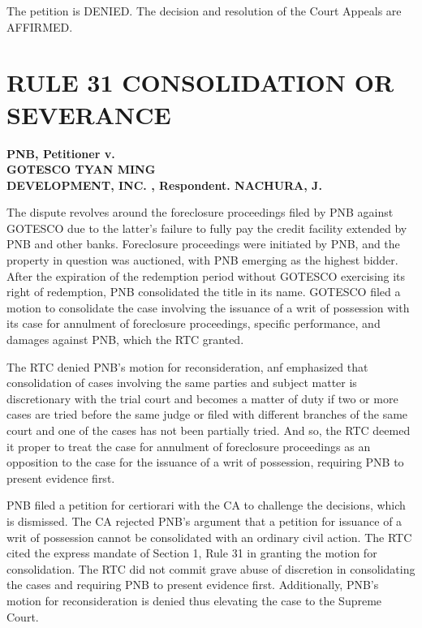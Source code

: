 \documentclass[
12pt,
oneside,
onehalfspacing,
headsepline
]{DigestCollection}
\begin{document}
The petition is DENIED. The decision and resolution of the Court Appeals are AFFIRMED.

\chapter{RULE 31 CONSOLIDATION OR SEVERANCE}
\label{80ccabf0-0a16-11ef-932c-63c852f65e48}


\label{1cbd0350-0a2d-11ef-a1a5-03b0bde1fccf}


\noindent\textbf{PNB, Petitioner v. \\GOTESCO TYAN MING \\DEVELOPMENT, INC. , Respondent. NACHURA, J.}\vspace{0.4cm}

The dispute revolves around the foreclosure proceedings filed by PNB against GOTESCO due to the latter's failure to fully pay the credit facility extended by PNB and other banks. Foreclosure proceedings were initiated by PNB, and the property in question was auctioned, with PNB emerging as the highest bidder. After the expiration of the redemption period without GOTESCO exercising its right of redemption, PNB consolidated the title in its name. GOTESCO filed a motion to consolidate the case involving the issuance of a writ of possession with its case for annulment of foreclosure proceedings, specific performance, and damages against PNB, which the RTC granted.

The RTC denied PNB's motion for reconsideration, anf emphasized that consolidation of cases involving the same parties and subject matter is discretionary with the trial court and becomes a matter of duty if two or more cases are tried before the same judge or filed with different branches of the same court and one of the cases has not been partially tried. And so, the RTC deemed it proper to treat the case for annulment of foreclosure proceedings as an opposition to the case for the issuance of a writ of possession, requiring PNB to present evidence first.

PNB filed a petition for certiorari with the CA to challenge the decisions, which is dismissed. The CA rejected PNB's argument that a petition for issuance of a writ of possession cannot be consolidated with an ordinary civil action. The RTC cited the express mandate of Section 1, Rule 31 in granting the motion for consolidation. The RTC did not commit grave abuse of discretion in consolidating the cases and requiring PNB to present evidence first. Additionally, PNB's motion for reconsideration is denied thus elevating the case to the Supreme Court.
\end{document}
